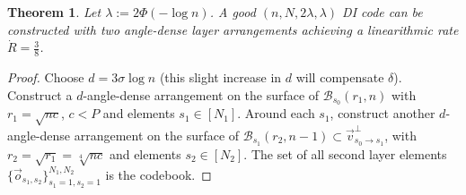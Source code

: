 \documentclass[10pt,conference]{IEEEtran}
\newtheorem{theorem}{Theorem}
\newcommand{\1}{\mathds{1}}
\newcommand{\cB}{\mathcal{B}}
\begin{document}
\begin{theorem}\label{thm:double-layer}
Let $\lambda:=2\Phi(-\log n)$. A good $(n,N,2\lambda,\lambda)$ DI code can be constructed with two angle-dense layer arrangements achieving a linearithmic rate $\dot{R}=\frac38$.
\end{theorem}
\begin{proof}
Choose $d=3\sigma\log n$ (this slight increase in $d$ will compensate $\delta$). Construct a $d$-angle-dense arrangement on the surface of $\cB_{s_0}(r_1,n)$ with $r_1=\sqrt{nc}$, $c<P$ and elements $s_1\in[N_1]$. Around each $s_1$, construct another $d$-angle-dense arrangement on the surface of $\cB_{s_1}(r_2,n-1)\subset\vec v_{s_0\to s_1}^\perp$, with $r_2=\sqrt{r_1}=\sqrt[4]{nc}$ and elements $s_2\in[N_2]$. The set of all second layer elements $\{\vec o_{s_1,s_2}\}_{s_1=1,s_2=1}^{N_1,N_2}$ is the codebook. 


\end{proof}
\end{document}
